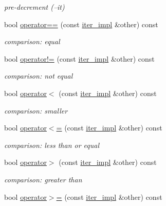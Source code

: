 \begin{DoxyCompactItemize}
\begin{DoxyCompactList}\small\item\em pre-\/decrement (--it) \end{DoxyCompactList}\item 
bool \hyperlink{classnlohmann_1_1basic__json_1_1iter__impl_af3beb0d08550188082ea64d8becd12fb}{operator==} (const \hyperlink{classnlohmann_1_1basic__json_1_1iter__impl}{iter\+\_\+impl} \&other) const
\begin{DoxyCompactList}\small\item\em comparison\+: equal \end{DoxyCompactList}\item 
bool \hyperlink{classnlohmann_1_1basic__json_1_1iter__impl_af6f10c91f59565b6c6e7205ab6969a89}{operator!=} (const \hyperlink{classnlohmann_1_1basic__json_1_1iter__impl}{iter\+\_\+impl} \&other) const
\begin{DoxyCompactList}\small\item\em comparison\+: not equal \end{DoxyCompactList}\item 
bool \hyperlink{classnlohmann_1_1basic__json_1_1iter__impl_a63c655881b0b7b7499a333ba77a7e4d1}{operator$<$} (const \hyperlink{classnlohmann_1_1basic__json_1_1iter__impl}{iter\+\_\+impl} \&other) const
\begin{DoxyCompactList}\small\item\em comparison\+: smaller \end{DoxyCompactList}\item 
bool \hyperlink{classnlohmann_1_1basic__json_1_1iter__impl_a5ed57d38f57f669f5788cea881772403}{operator$<$=} (const \hyperlink{classnlohmann_1_1basic__json_1_1iter__impl}{iter\+\_\+impl} \&other) const
\begin{DoxyCompactList}\small\item\em comparison\+: less than or equal \end{DoxyCompactList}\item 
bool \hyperlink{classnlohmann_1_1basic__json_1_1iter__impl_ae6c8e672ff064e0b92073b4dd939ada6}{operator$>$} (const \hyperlink{classnlohmann_1_1basic__json_1_1iter__impl}{iter\+\_\+impl} \&other) const
\begin{DoxyCompactList}\small\item\em comparison\+: greater than \end{DoxyCompactList}\item 
bool \hyperlink{classnlohmann_1_1basic__json_1_1iter__impl_a53a239bddcbd557f335d275c806535c1}{operator$>$=} (const \hyperlink{classnlohmann_1_1basic__json_1_1iter__impl}{iter\+\_\+impl} \&other) const

\end{DoxyCompactItemize}
